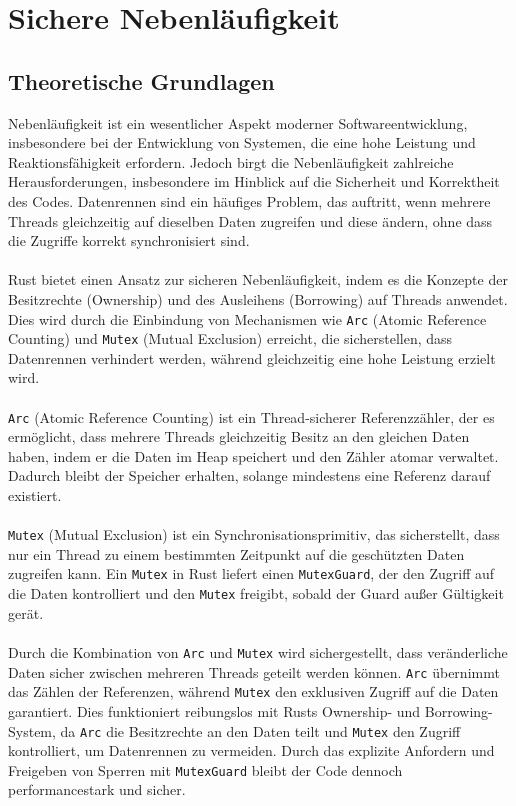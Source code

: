 \chapter{Sichere Nebenläufigkeit}

\section{Theoretische Grundlagen}

Nebenläufigkeit ist ein wesentlicher Aspekt moderner Softwareentwicklung, insbesondere bei der Entwicklung von Systemen, die eine hohe Leistung und Reaktionsfähigkeit erfordern. 
Jedoch birgt die Nebenläufigkeit zahlreiche Herausforderungen, insbesondere im Hinblick auf die Sicherheit und Korrektheit des Codes.
Datenrennen sind ein häufiges Problem, das auftritt, wenn mehrere Threads gleichzeitig auf dieselben Daten zugreifen und diese ändern, ohne dass die Zugriffe korrekt synchronisiert sind.\\ 
\\
Rust bietet einen Ansatz zur sicheren Nebenläufigkeit, indem es die Konzepte der Besitzrechte (Ownership) und des Ausleihens (Borrowing) auf Threads anwendet. 
Dies wird durch die Einbindung von Mechanismen wie \texttt{Arc} (Atomic Reference Counting) und \texttt{Mutex} (Mutual Exclusion) erreicht, die sicherstellen, dass Datenrennen verhindert werden, während gleichzeitig eine hohe Leistung erzielt wird.\\
\\
\texttt{Arc} (Atomic Reference Counting) ist ein Thread-sicherer Referenzzähler, der es ermöglicht, dass mehrere Threads gleichzeitig Besitz an den gleichen Daten haben, indem er die Daten im Heap speichert und den Zähler atomar verwaltet. 
Dadurch bleibt der Speicher erhalten, solange mindestens eine Referenz darauf existiert.\\
\\
\texttt{Mutex} (Mutual Exclusion) ist ein Synchronisationsprimitiv, das sicherstellt, dass nur ein Thread zu einem bestimmten Zeitpunkt auf die geschützten Daten zugreifen kann. 
Ein \texttt{Mutex} in Rust liefert einen \texttt{MutexGuard}, der den Zugriff auf die Daten kontrolliert und den \texttt{Mutex} freigibt, sobald der Guard außer Gültigkeit gerät.\\
\\
Durch die Kombination von \texttt{Arc} und \texttt{Mutex} wird sichergestellt, dass veränderliche Daten sicher zwischen mehreren Threads geteilt werden können. 
\texttt{Arc} übernimmt das Zählen der Referenzen, während \texttt{Mutex} den exklusiven Zugriff auf die Daten garantiert. 
Dies funktioniert reibungslos mit Rusts Ownership- und Borrowing-System, da \texttt{Arc} die Besitzrechte an den Daten teilt und \texttt{Mutex} den Zugriff kontrolliert, um Datenrennen zu vermeiden. 
Durch das explizite Anfordern und Freigeben von Sperren mit \texttt{MutexGuard} bleibt der Code dennoch performancestark und sicher.

